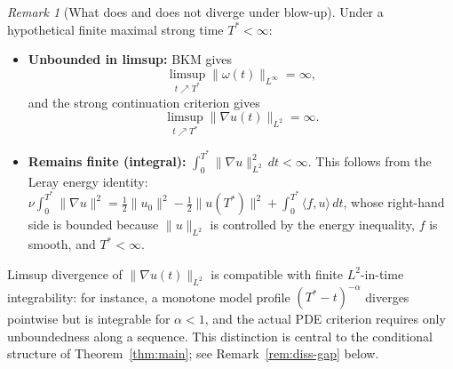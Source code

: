 \documentclass[12pt,a4paper]{article}
\theoremstyle{definition}
\theoremstyle{plain}
\theoremstyle{remark}
\newtheorem{remark}[definition]{Remark}
\begin{document}
\begin{remark}[What does and does not diverge under blow-up]
\label{rem:divergence-landscape}
Under a hypothetical finite maximal strong time $T^* < \infty$:
\begin{itemize}
  \item \textbf{Unbounded in limsup:}\;
    BKM gives
    \[
      \limsup_{t\nearrow T^*}\|\omega(t)\|_{L^\infty} = \infty,
    \]
    and the strong continuation criterion gives
    \[
      \limsup_{t\nearrow T^*}\|\nabla u(t)\|_{L^2} = \infty.
    \]
  \item \textbf{Remains finite (integral):}\;
    $\int_0^{T^*}\|\nabla u\|_{L^2}^2\,dt < \infty$.
    This follows from the Leray energy identity:
    $\nu\int_0^{T^*}\|\nabla u\|^2
    = \tfrac{1}{2}\|u_0\|^2 - \tfrac{1}{2}\|u(T^*)\|^2
    + \int_0^{T^*}\langle f,u\rangle\,dt$,
    whose right-hand side is bounded because $\|u\|_{L^2}$ is
    controlled by the energy inequality, $f$ is smooth, and $T^* < \infty$.
\end{itemize}
Limsup divergence of $\|\nabla u(t)\|_{L^2}$ is compatible with
finite $L^2$-in-time integrability: for instance, a monotone model profile
$(T^*-t)^{-\alpha}$ diverges pointwise but is integrable for $\alpha < 1$,
and the actual PDE criterion requires only unboundedness along a sequence.
This distinction is central to the conditional structure of
Theorem~\ref{thm:main}; see Remark~\ref{rem:diss-gap} below.
\end{remark}
\end{document}
